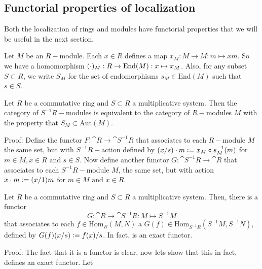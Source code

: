 \subsection{Functorial properties of localization}
Both the localization of rings and modules have functorial properties that we will be useful in the next section.
\begin{dang}
\begin{notation}\label{notation for x_M which maps m to xm}
    Let $M$ be an $R-$module. Each $x\in R$ defines a map $x_M:M\rightarrow M: m\mapsto xm$. So we have a homomorphism $(\cdot)_M:R\rightarrow \text{End}(M):x\mapsto x_M$. Also, for any subset $S\subset R$, we write $S_M$ for the set of endomorphisms $s_M\in\text{End}(M)$ such that $s\in S$. 
\end{notation}
\end{dang}
\begin{dang}
    \begin{theorem}\label{functorial_property_of_localization}
        Let $R$ be a commutative ring and $S\subset R$ a multiplicative system. Then the category of $S^{-1}R-$modules is equivalent to the category of $R-$modules $M$ with the property that $S_M\subset\text{Aut}(M)$.
    \end{theorem}
\end{dang}
Proof: Define the functor $F:\cat{R}\rightarrow\cat{S^{-1}R}$ that associates to each $R-$module $M$ the same set, but with $S^{-1}R-$action defined by $(x/s)\cdot m\bydef x_M\circ s_M^{-1}(m)$ for $m\in M, x\in R\text{ and }s\in S$. Now define another functor $G:\cat{S^{-1}R}\rightarrow\cat{R}$ that associates to each $S^{-1}R-$module $M$, the same set, but with action $x\cdot m\bydef (x/1)m$ for $m\in M\text{ and }x\in R$. 
\begin{dang}
    \begin{theorem}\label{functor_from_R_to_localization}
        Let $R$ be a commutative ring and $S\subset R$ a multiplicative system. Then, there is a functor 
        \begin{equation}
            G:\cat{R}\rightarrow\cat{S^{-1}R}: M\mapsto S^{-1}M
        \end{equation}
        that associates to each $f\in\text{Hom}_{R}(M,N)$ a $G(f)\in\text{Hom}_{S^{-1}R}(S^{-1}M,S^{-1}N)$, defined by $G(f)(x/s)\bydef f(x)/s$. In fact, is an exact functor.
    \end{theorem}
\end{dang}
Proof: The fact that it is a functor is clear, now lets show that this in fact, defines an exact functor. Let
